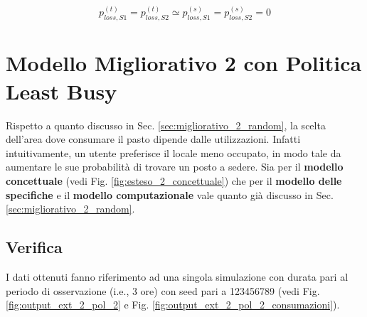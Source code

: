 \documentclass{article}
\begin{document}
\[p_{loss, S1}^{(t)} = p_{loss, S2}^{(t)} \simeq p_{loss, S1}^{(s)} = p_{loss, S2}^{(s)} = 0 \]

\section{Modello Migliorativo 2 con Politica Least Busy}

Rispetto a quanto discusso in Sec. \ref{sec:migliorativo_2_random}, la scelta dell'area dove consumare il pasto dipende dalle utilizzazioni. Infatti intuitivamente, un utente preferisce il locale meno occupato, in modo tale da aumentare le sue probabilità di trovare un posto a sedere.
Sia per il \textbf{modello concettuale} (vedi Fig. \ref{fig:esteso_2_concettuale}) che per il \textbf{modello delle specifiche} e il \textbf{modello computazionale} vale quanto già discusso in Sec. \ref{sec:migliorativo_2_random}.

\subsection{Verifica}

I dati ottenuti fanno riferimento ad una singola simulazione con durata pari al periodo di osservazione (i.e.,  3 ore) con seed pari a 123456789 (vedi Fig. \ref{fig:output_ext_2_pol_2} e Fig. \ref{fig:output_ext_2_pol_2_consumazioni}).
\end{document}

